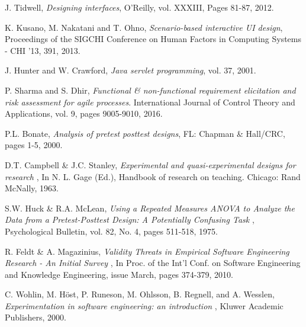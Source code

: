 \begin{thebibliography}{1}
	 J. Tidwell, {\em Designing interfaces}, O'Reilly, vol. XXXIII, Pages 81-87, 2012.
	
	 K. Kusano, M. Nakatani and T. Ohno, {\em Scenario-based interactive UI design}, Proceedings of the SIGCHI Conference on Human Factors in Computing Systems - CHI '13, 391,  2013.
	
	 J. Hunter and W. Crawford, {\em Java servlet programming}, vol. 37, 2001.
	
	 P. Sharma and S. Dhir, {\em Functional \& non-functional requirement elicitation and risk assessment for agile processes}. International Journal of Control Theory and Applications, vol. 9, pages 9005-9010, 2016.
	
	 P.L. Bonate, {\em Analysis of pretest posttest designs}, FL: Chapman \& Hall/CRC, pages 1-5, 2000.
	
	 D.T. Campbell \& J.C. Stanley, {\em Experimental and quasi-experimental designs for research }, In N. L. Gage (Ed.), Handbook of research on teaching. Chicago: Rand McNally, 1963.
	
	 S.W. Huck \& R.A. McLean, {\em Using a Repeated Measures ANOVA to Analyze the Data from a Pretest-Posttest Design: A Potentially Confusing Task }, Psychological Bulletin, vol. 82, No. 4, pages 511-518, 1975. 
	
	 R. Feldt \& A. Magazinius, {\em Validity Threats in Empirical Software Engineering Research - An Initial Survey } , In Proc. of the Int'l Conf. on Software Engineering and Knowledge Engineering, issue March, pages 374-379, 2010.
	
	 C. Wohlin, M. H\"ost, P. Runeson, M. Ohlsson, B. Regnell, and A. Wesslen, {\em Experimentation in software engineering: an introduction }, Kluwer Academic Publishers, 2000.
	
	
\end{thebibliography}




